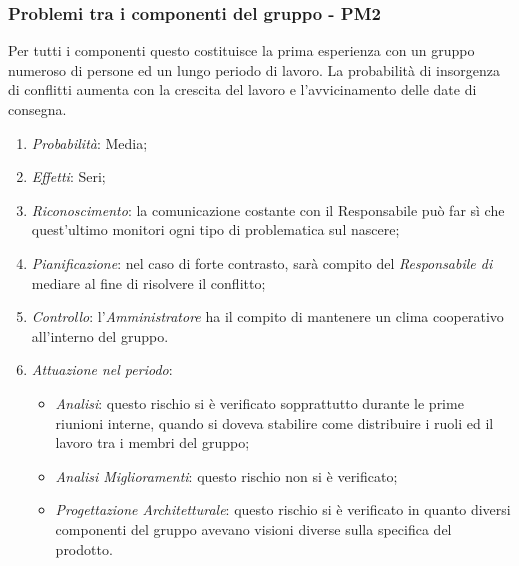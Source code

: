 \subsubsection{Problemi tra i componenti del gruppo - PM2}
Per tutti i componenti questo  costituisce la prima esperienza con un gruppo numeroso di persone ed un lungo periodo di lavoro. La probabilit\`a di insorgenza di conflitti aumenta con la crescita del lavoro e l'avvicinamento delle date di consegna.
\begin{enumerate}
\item \textit{Probabilit\`a}: Media;
\item \textit{Effetti}: Seri;
\item \textit{Riconoscimento}: la comunicazione costante con il Responsabile può far sì che quest’ultimo monitori ogni tipo di problematica sul nascere;
\item \textit{Pianificazione}: nel caso di forte contrasto, sar\`a compito del \textit{Responsabile di } mediare al fine di risolvere il conflitto;
\item \textit{Controllo}: l'\textit{Amministratore} ha il compito di mantenere un clima cooperativo all'interno del gruppo.
\item \textit{Attuazione nel periodo}: 
	\begin{itemize}
	\item \textit{Analisi}: questo rischio si è verificato sopprattutto durante le prime riunioni interne, quando si doveva stabilire come distribuire i ruoli ed il lavoro tra i membri del gruppo;
	\item \textit{Analisi Miglioramenti}: questo rischio non si è verificato;
	\item \textit{Progettazione Architetturale}: questo rischio si è verificato in quanto diversi componenti del gruppo avevano visioni diverse sulla specifica del prodotto.
	\end{itemize}
\end{enumerate} 

